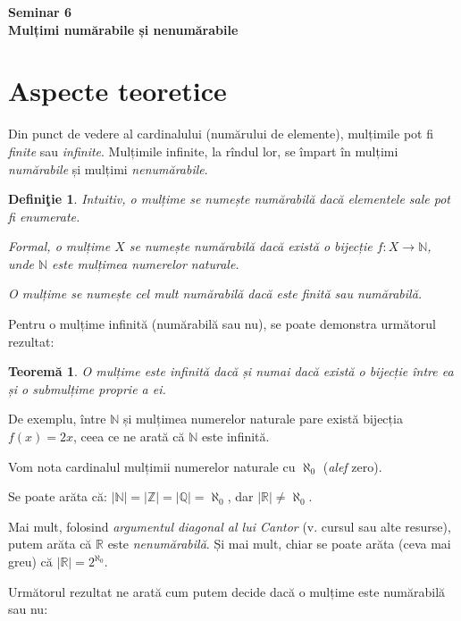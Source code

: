 \documentclass[11pt,a4paper]{article}
\newcommand\NN{\mathbb{N}}
\newcommand\RR{\mathbb{R}}
\newcommand\ZZ{\mathbb{Z}}
\newcommand\QQ{\mathbb{Q}}
\theoremstyle{dotless}
\newtheorem{theorem}{Teorem\u{a}}[section]
\theoremstyle{dotlessdr}
\newtheorem{definition}{Defini\c{t}ie}[section]
\begin{document}
\begin{center}
  {\large\textbf{Seminar 6 \\ Mulțimi numărabile și nenumărabile}}
\end{center}

\vspace{1cm}

\section{Aspecte teoretice}
\label{sec:teorie-multimi}



Din punct de vedere al cardinalului (numărului de elemente), mulțimile pot fi
\emph{finite} sau \emph{infinite}. Mulțimile infinite, la rîndul lor, se împart în
mulțimi \emph{numărabile} și mulțimi \emph{nenumărabile}.

\begin{definition}\label{def:numarabil}
  Intuitiv, o mulțime se numește \emph{numărabilă} dacă elementele sale pot fi
  enumerate.

  Formal, o mulțime $X$ se numește \emph{numărabilă} dacă există o bijecție
  $f : X \to \NN$, unde $\NN$ este mulțimea numerelor naturale.

  O mulțime se numește \emph{cel mult numărabilă} dacă este finită sau numărabilă.
\end{definition}

Pentru o mulțime infinită (numărabilă sau nu), se poate demonstra următorul rezultat:

\begin{theorem}\label{thm:num-subm}
  O mulțime este infinită dacă și numai dacă există o bijecție între ea și o submulțime
  proprie a ei.
\end{theorem}

De exemplu, între $\NN$ și mulțimea numerelor naturale pare există bijecția $f(x) = 2x$,
ceea ce ne arată că $\NN$ este infinită.

Vom nota cardinalul mulțimii numerelor naturale cu $\aleph_0$ (\emph{alef} zero).

Se poate arăta că: $| \NN | = | \ZZ | = | \QQ | = \aleph_0$, dar $| \RR | \neq \aleph_0$.

Mai mult, folosind \emph{argumentul diagonal al lui Cantor} (v. cursul sau
alte resurse), putem arăta că $\RR$ este \emph{nenumărabilă}. Și mai mult, chiar
se poate arăta (ceva mai greu) că $| \RR | = 2^{\aleph_0}$.

Următorul rezultat ne arată cum putem decide dacă o mulțime este numărabilă sau nu:
\end{document}
